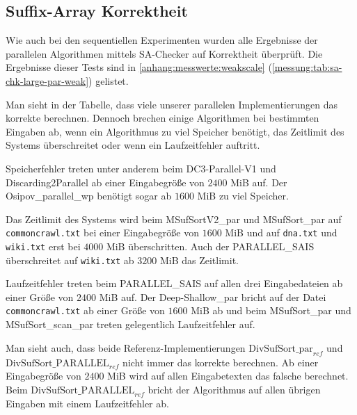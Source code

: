 \subsection{Suffix-Array Korrektheit}

Wie  auch bei den sequentiellen Experimenten wurden alle Ergebnisse der parallelen Algorithmen mittels SA-Checker auf Korrektheit überprüft.
Die Ergebnisse dieser Tests sind in \cref{anhang:messwerte:weakscale} (\cref{messung:tab:sa-chk-large-par-weak}) gelistet.

Man sieht in der Tabelle, dass viele unserer parallelen Implementierungen das korrekte \sa berechnen. Dennoch brechen einige Algorithmen bei bestimmten Eingaben ab, wenn ein Algorithmus zu viel Speicher benötigt, das Zeitlimit des Systems überschreitet oder wenn ein Laufzeitfehler auftritt. \par
Speicherfehler treten unter anderem beim DC3-Parallel-V1 und Discarding2\-Parallel ab einer Eingabegröße von $2400$ MiB auf. Der Osipov\_parallel\_wp benötigt sogar ab $1600$ MiB zu viel Speicher. \par
Das Zeitlimit des Systems wird beim MSufSortV2\_par und MSufSort\_par auf \texttt{commoncrawl.txt} bei einer Eingabegröße von $1600$ MiB und auf \texttt{dna.txt} und \texttt{wiki.txt} erst bei $4000$ MiB überschritten. Auch der PARALLEL\_SAIS überschreitet auf \texttt{wiki.txt} ab $3200$ MiB das Zeitlimit. \par
Laufzeitfehler treten beim PARALLEL\_SAIS auf allen drei Eingabedateien ab einer Größe von $2400$ MiB auf. Der Deep-Shallow\_par bricht auf der Datei \texttt{commoncrawl.txt} ab einer Größe von $1600$ MiB ab und beim MSufSort\_par und MSufSort\_scan\_par treten gelegentlich Laufzeitfehler auf. \par
Man sieht auch, dass beide Referenz-Implementierungen $\text{DivSufSort\_par}_{ref}$ und $\text{DivSufSort\_PARALLEL}_{ref}$ nicht immer das korrekte \sa berechnen. Ab einer Eingabegröße von $2400$ MiB wird auf allen Eingabetexten das falsche \sa berechnet. Beim $\text{DivSufSort\_PARALLEL}_{ref}$ bricht der Algorithmus auf allen übrigen Eingaben mit einem Laufzeitfehler ab.
